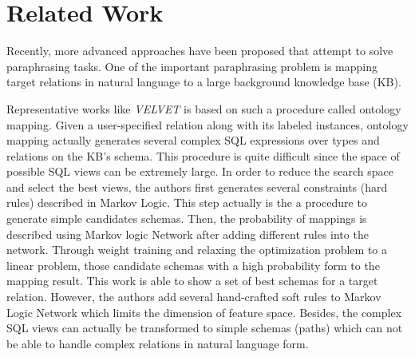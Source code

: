 \section{Related Work}


Recently, more advanced approaches have been proposed that attempt to solve paraphrasing tasks. One of the important paraphrasing problem is mapping target relations in natural language to a large background knowledge base (KB).

Representative works like \textit{VELVET} \cite{zhang2012ontological} is based on such a procedure called ontology mapping. Given a user-specified relation along with its labeled instances, ontology mapping actually generates several complex SQL expressions over types and relations on the KB's schema. This procedure is quite difficult since the space of possible SQL views can be extremely large. In order to reduce the search space and select the best views, the authors first generates several constraints (hard rules) described in Markov Logic. This step actually is the a procedure to generate simple candidates schemas. Then, the probability of mappings is described using Markov logic Network after adding different rules into the network. Through weight training and relaxing the optimization problem to a linear problem, those candidate schemas with a high probability form to the mapping result. This work is able to show a set of best schemas for a target relation. However, the authors add several hand-crafted soft rules to Markov Logic Network which limits the dimension of feature space. Besides, the complex SQL views can actually be transformed to simple schemas (paths) which can not be able to handle complex relations in natural language form.

